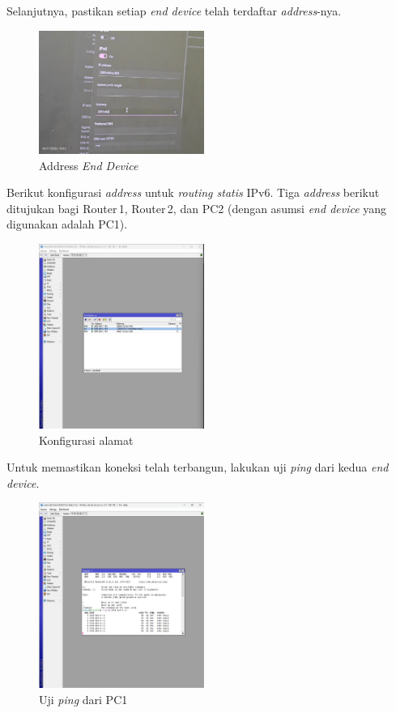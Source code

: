 Selanjutnya, pastikan setiap \textit{end device} telah terdaftar \textit{address}-nya.

\begin{figure}[H]
    \centering
    \includegraphics[width=0.48\textwidth]{img/address.jpeg}
    \caption{Address \textit{End Device}}
    \label{fig:address}
\end{figure}

Berikut konfigurasi \textit{address} untuk \textit{routing statis} IPv6. Tiga \textit{address} berikut ditujukan bagi Router\,1, Router\,2, dan PC2 (dengan asumsi \textit{end device} yang digunakan adalah PC1).

\begin{figure}[H]
    \centering
    \includegraphics[width=0.48\textwidth]{img/A1.jpeg}
    \caption{Konfigurasi alamat}
    \label{fig:a1}
\end{figure}

Untuk memastikan koneksi telah terbangun, lakukan uji \textit{ping} dari kedua \textit{end device}.

\begin{figure}[H]
    \centering
    \includegraphics[width=0.48\textwidth]{img/A2.jpeg}
    \caption{Uji \textit{ping} dari PC1}
    \label{fig:a2a}
\end{figure}

